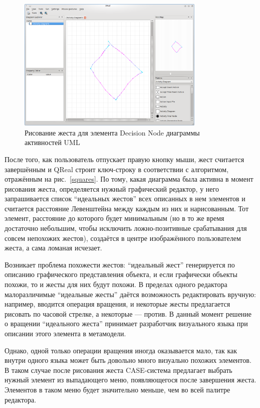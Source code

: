 \documentclass[a5paper]{article}
\begin{document}
\begin{figure} [ht]
  \begin{center}
    \includegraphics[width=0.8\textwidth, bb=0 0 800 600]{05-drawing.png}
    \caption{Рисование жеста для элемента Decision Node диаграммы активностей UML}
    \label{drawing}
  \end{center}
\end{figure}

После того, как пользователь отпускает правую кнопку мыши, жест считается завершённым и QReal строит ключ-строку в соответствии с алгоритмом, отражённым на рис.~\ref{squares}. По тому, какая диаграмма была активна в момент рисования жеста, определяется нужный графический редактор, у него запрашивается список ``идеальных жестов'' всех описанных в нем элементов и считается расстояние Левенштейна между каждым из них и нарисованным. Тот элемент, расстояние до которого будет минимальным (но в то же время достаточно небольшим, чтобы исключить ложно-позитивные срабатывания для совсем непохожих жестов), создаётся в центре изображённого пользователем жеста, а сама ломаная исчезает. 

Возникает проблема похожести жестов: ``идеальный жест'' генерируется по описанию графического представления объекта, и если графически объекты похожи, то и жесты для них будут похожи. В пределах одного редактора малоразличимые ``идеальные жесты'' даётся возможность редактировать вручную: например, вводится операция вращения, и некоторые жесты предлагается рисовать по часовой стрелке, а некоторые --- против. В данный момент решение о вращении ``идеального жеста'' принимает разработчик визуального языка при описании этого элемента в метамодели. 

Однако, одной только операции вращения иногда оказывается мало, так как внутри одного языка может быть довольно много визуально похожих элементов. В таком случае после рисования жеста CASE-система предлагает выбрать нужный элемент из выпадающего меню, появляющегося после завершения жеста. Элементов в таком меню будет значительно меньше, чем во всей палитре редактора.
\end{document}
